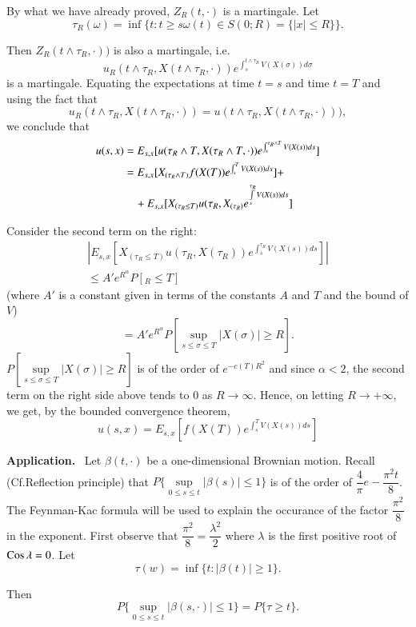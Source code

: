 By what we have already proved, $Z_{R}(t,\cdot)$ is a martingale. Let
$$
\tau_{R}(\omega)=\inf \{t:t\geq s\omega(t)\in S(0;R)=\{|x|\leq R\}\}.
$$

Then $Z_{R}(t\wedge \tau_{R},\cdot))$ is also a martingale, i.e.
$$
u_{R}(t\wedge \tau_{R},X(t\wedge \tau_{R},\cdot))e^{\int^{t\wedge
    \tau_{R}}_{s}V(X(\sigma))d\sigma}
$$
is a martingale. Equating the expectations at time $t=s$ and time
$t=T$ and using the fact that
$$
u_{R}(t\wedge \tau_{R},X(t\wedge
\tau_{R},\cdot))=u(t\wedge\tau_{R},X(t\wedge \tau_{R},\cdot))),
$$
we conclude that
\begin{align*}
u(s,x) &= E_{s,x}[u(\tau_{R}\wedge T,X(\tau_{R}\wedge
  T,\cdot))e^{\int^{\tau_{R}\wedge T}_{s}V(X(s))ds}]\\
&= E_{s,x}[X_{(\tau_{R}\wedge T)}f(X(T))e^{\int^{T}_{s}V(X(s))ds}]+\\
&\quad +E_{s,x}[X_{(\tau_{R}\leq T)}u(\tau_{R},X_{(\tau_{R})}e^{\int\limits^{\tau_{R}}_{s}V(X(s))ds}]
\end{align*}\pageoriginale

Consider the second term on the right:
\begin{gather*}
|E_{s,x}[X_{(\tau_{R}\leq
    T)}u(\tau_{R},X(\tau_{R}))e^{\int^{\tau_{R}}_{s}V(X(s))ds}]|\\
\leq A'e^{R^{\alpha}}P[{}_{R}\leq T]
\end{gather*}
(where $A'$ is a constant given in terms of the constants $A$ and $T$
and the bound of $V$)
$$
=A'e^{R^{\alpha}}P[\sup\limits_{s\leq \sigma\leq T}|X(\sigma)|\geq R].
$$
$P[\sup\limits_{s\leq \sigma\leq T}|X(\sigma)|\geq R]$ is of the order
of $e^{-c(T)R^{2}}$ and since $\alpha<2$, the second term on the right
side above tends to $0$ as $R\to \infty$. Hence, on letting $R\to
+\infty$, we get, by the bounded convergence theorem,
$$
u(s,x)=E_{s,x}[f(X(T))e^{\int^{T}_{s}V(X(s))ds}]
$$

\noindent
{\bf Application.}~ Let $\beta(t,\cdot)$ be a one-dimensional Brownian
motion. Recall (Cf.\@ Reflection principle) that
$P\{\sup\limits_{0\leq s\leq t}|\beta(s)|\leq 1\}$ is of the order of
$\dfrac{4}{\pi}e-\dfrac{\pi^{2}t}{8}$. The Feynman-Kac formula will be
used to explain the occurance of the factor $\dfrac{\pi^{2}}{8}$ in
the exponent. First observe that
$\dfrac{\pi^{2}}{8}=\dfrac{\lambda^{2}}{2}$ where $\lambda$ is the
first positive root of $\operatorname{Cos} \lambda=0$. Let
$$
\tau(w)=\inf \{t:|\beta(t)|\geq 1\}.
$$

Then 
$$
P\{\sup\limits_{0\leq s\leq t}|\beta(s,\cdot)|\leq 1\}=P\{\tau\geq
t\}.
$$

